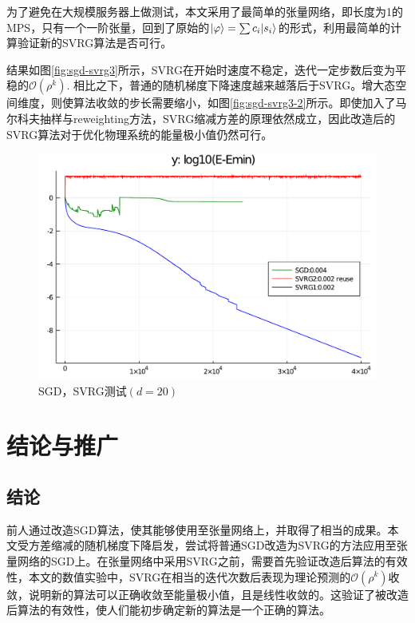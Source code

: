 为了避免在大规模服务器上做测试，本文采用了最简单的张量网络，即长度为1的MPS，只有一个一阶张量，回到了原始的$\lvert\varphi\rangle=\sum c_i\lvert s_i\rangle$的形式，利用最简单的计算验证新的SVRG算法是否可行。

结果如图\ref{fig:sgd-svrg3}所示，SVRG在开始时速度不稳定，迭代一定步数后变为平稳的$\mathcal{O}(\rho^k)$. 相比之下，普通的随机梯度下降速度越来越落后于SVRG。增大态空间维度，则使算法收敛的步长需要缩小，如图\ref{fig:sgd-svrg3-2}所示。即使加入了马尔科夫抽样与reweighting方法，SVRG缩减方差的原理依然成立，因此改造后的SVRG算法对于优化物理系统的能量极小值仍然可行。
\begin{figure}[htb]
	\centering
	\includegraphics[width=1\textwidth]{image/SVRGexTest6_diverge.pdf}
	\caption{SGD，SVRG测试$(d=20)$}
	\label{fig:sgd-svrg4}
\end{figure}

\section{结论与推广}

\subsection{结论}

前人通过改造SGD算法，使其能够使用至张量网络上，并取得了相当的成果。本文受方差缩减的随机梯度下降启发，尝试将普通SGD改造为SVRG的方法应用至张量网络的SGD上。在张量网络中采用SVRG之前，需要首先验证改造后算法的有效性，本文的数值实验中，SVRG在相当的迭代次数后表现为理论预测的$\mathcal{O}(\rho^k)$收敛，说明新的算法可以正确收敛至能量极小值，且是线性收敛的。这验证了被改造后算法的有效性，使人们能初步确定新的算法是一个正确的算法。

